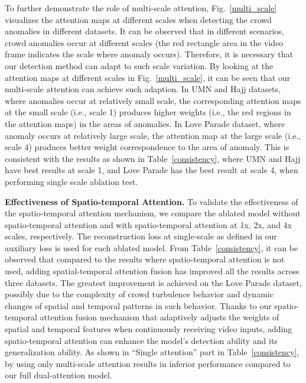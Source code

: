 \documentclass[journal]{IEEEtran}
\begin{document}
To further demonstrate the role of multi-scale attention, Fig.~\ref{multi_scale} visualizes the attention maps at different scales when detecting the crowd anomalies in different datasets. It can be observed that in different scenarios, crowd anomalies occur at different scales (the red rectangle area in the video frame indicates the scale where anomaly occurs). Therefore, it is necessary that our detection method can adapt to such scale variation. By looking at the attention maps at different scales in Fig.~\ref{multi_scale}, it can be seen that our multi-scale attention can achieve such adaption. In UMN and Hajj datasets, where anomalies occur at relatively small scale, the corresponding attention maps at the small scale (i.e., scale 1) produces higher weights (i.e., the red regions in the attention maps) in the areas of anomalies. In Love Parade dataset, where anomaly occurs at relatively large scale, the attention map at the large scale (i.e., scale 4) produces better weight correspondence to the area of anomaly. This is consistent with the results as shown in Table~\ref{consistency}, where UMN and Hajj have best results at scale 1, and Love Parade has the best result at scale 4, when performing single scale ablation test.  



\vskip 0.02in
\noindent \textbf{Effectiveness of Spatio-temporal Attention.}
To validate the effectiveness of the spatio-temporal attention mechanism, we compare the ablated model without spatio-temporal attention and with spatio-temporal attention at 1x, 2x, and 4x scales, respectively. The reconstruction loss at single-scale as defined in our auxiliary loss is used for each ablated model. From Table~\ref{consistency}, it can be observed that compared to the results where spatio-temporal attention is not used, adding spatial-temporal attention fusion has improved all the results across three datasets. The greatest improvement is achieved on the Love Parade dataset, possibly due to the complexity of crowd turbulence behavior and dynamic changes of spatial and temporal patterns in such behavior. Thanks to our spatio-temporal attention fusion mechanism that adaptively adjusts the weights of spatial and temporal features when continuously receiving video inputs, adding spatio-temporal attention can enhance the model's detection ability and its generalization ability. As shown in “Single attention” part in Table~\ref{consistency}, by using only multi-scale attention results in inferior performance compared to our full dual-attention model.
\end{document}
